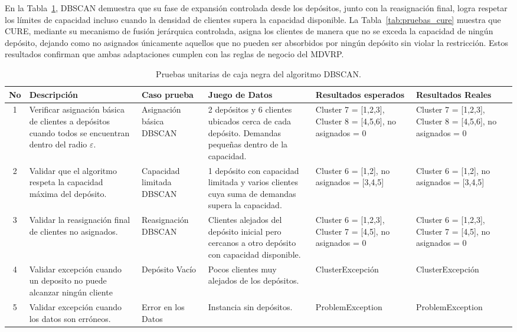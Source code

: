 En la Tabla~\ref{tab:pruebas_dbscan}, DBSCAN demuestra que su fase de expansi\'on controlada desde los dep\'ositos, junto con la reasignaci\'on final, logra respetar los l\'imites de capacidad incluso cuando la densidad de clientes supera la capacidad disponible. La Tabla~\ref{tab:pruebas_cure} muestra que CURE, mediante su mecanismo de fusi\'on jer\'arquica controlada, asigna los clientes de manera que no se exceda la capacidad de ning\'un dep\'osito, dejando como no asignados \'unicamente aquellos que no pueden ser absorbidos por ning\'un dep\'osito sin violar la restricci\'on. Estos resultados confirman que ambas adaptaciones cumplen con las reglas de negocio del MDVRP.

\begin{table}[H]
\centering
\caption{Pruebas unitarias de caja negra del algoritmo DBSCAN.}
\label{tab:pruebas_dbscan}
\footnotesize
\begin{tabular}{@{}cp{2.6cm}p{2.2cm}p{3cm}p{3cm}p{3cm}@{}}
\toprule
\textbf{No} & \textbf{Descripci\'on} & \textbf{Caso prueba} & \textbf{Juego de Datos} & \textbf{Resultados esperados} & \textbf{Resultados Reales} \\
\midrule
1 & Verificar asignaci\'on b\'asica de clientes a dep\'ositos cuando todos se encuentran dentro del radio $\varepsilon$. & Asignaci\'on b\'asica DBSCAN & 2 dep\'ositos y 6 clientes ubicados cerca de cada dep\'osito. Demandas peque\~nas dentro de la capacidad. & Cluster 7 = [1,2,3], Cluster 8 = [4,5,6], no asignados = 0 & Cluster 7 = [1,2,3], Cluster 8 = [4,5,6], no asignados = 0 \\
2 & Validar que el algoritmo respeta la capacidad m\'axima del dep\'osito. & Capacidad limitada DBSCAN & 1 dep\'osito con capacidad limitada y varios clientes cuya suma de demandas supera la capacidad. & Cluster 6 = [1,2], no asignados = [3,4,5] & Cluster 6 = [1,2], no asignados = [3,4,5] \\
3 & Validar la reasignaci\'on final de clientes no asignados. & Reasignaci\'on DBSCAN & Clientes alejados del dep\'osito inicial pero cercanos a otro dep\'osito con capacidad disponible. & Cluster 6 = [1,2,3], Cluster 7 = [4,5], no asignados = 0 & Cluster 6 = [1,2,3], Cluster 7 = [4,5], no asignados = 0 \\
4 & Validar excepci\'on cuando un deposito no puede alcanzar ning\'un cliente & Dep\'osito Vac\'io & Pocos clientes muy alejados de los dep\'ositos. & ClusterExcepci\'on & ClusterExcepci\'on \\
5 & Validar excepci\'on cuando los datos son err\'oneos. & Error en los Datos & Instancia sin dep\'ositos. & ProblemException & ProblemException \\
\bottomrule
\end{tabular}
\end{table}

